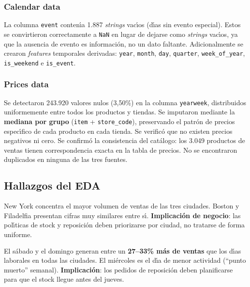 \documentclass[12pt, a4paper, oneside]{report}
\newcommand{\code}[1]{\texttt{\small\color{codeblue}#1}}
\begin{document}
\subsubsection{Calendar data}
La columna \code{event} conten\'{\i}a 1.887 \textit{strings} vac\'{\i}os (d\'{\i}as sin evento especial). Estos se convirtieron correctamente a \code{NaN} en lugar de dejarse como \textit{strings} vac\'{\i}os, ya que la ausencia de evento es informaci\'on, no un dato faltante. Adicionalmente se crearon \textit{features} temporales derivadas: \code{year}, \code{month}, \code{day}, \code{quarter}, \code{week\_of\_year}, \code{is\_weekend} e \code{is\_event}.

\subsubsection{Prices data}
Se detectaron 243.920 valores nulos (3,50\%) en la columna \code{yearweek}, distribuidos uniformemente entre todos los productos y tiendas. Se imputaron mediante la \textbf{mediana por grupo} (\code{item} + \code{store\_code}), preservando el patr\'on de precios espec\'{\i}fico de cada producto en cada tienda. Se verific\'o que no existen precios negativos ni cero. Se confirm\'o la consistencia del cat\'alogo: los 3.049 productos de ventas tienen correspondencia exacta en la tabla de precios. No se encontraron duplicados en ninguna de las tres fuentes.

\subsection{Hallazgos del EDA}

\begin{tcolorbox}[canvasbox, title={Hallazgo 1 --- Liderazgo geogr\'afico de New York}]
New York concentra el mayor volumen de ventas de las tres ciudades. Boston y Filadelfia presentan cifras muy similares entre s\'{\i}. \textbf{Implicaci\'on de negocio}: las pol\'{\i}ticas de stock y reposici\'on deben priorizarse por ciudad, no tratarse de forma uniforme.
\end{tcolorbox}

\begin{tcolorbox}[canvasbox, title={Hallazgo 2 --- Efecto fin de semana consistente y cuantificado}]
El s\'abado y el domingo generan entre un \textbf{27--33\% m\'as de ventas} que los d\'{\i}as laborales en todas las ciudades. El mi\'ercoles es el d\'{\i}a de menor actividad (``punto muerto'' semanal). \textbf{Implicaci\'on}: los pedidos de reposici\'on deben planificarse para que el stock llegue antes del jueves.
\end{tcolorbox}
\end{document}
